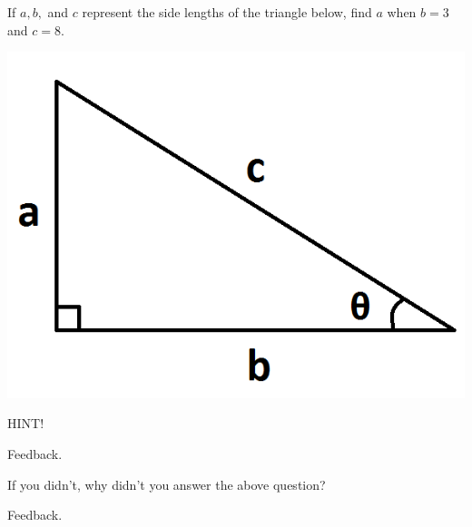\documentclass{ximera}
\begin{document}
\begin{problem} 

\begin{problem}
    
    If $a, b,$ and $c$ represent the side lengths of the triangle below, find $a$ when $b = 3$ and $c = 8$.
    
    \begin{center} \includegraphics[scale=0.3]{Triangle.png} \end{center}
    
    \begin{hint}
    HINT!
    \end{hint}

  \begin{multipleChoice}
      
      \begin{feedback}[attempt]
          Feedback.
      \end{feedback}
      
  \end{multipleChoice}
  
\end{problem}

\begin{question}
  
    If you didn't, why didn't you answer the above question?
  
  \begin{multipleChoice}
      
      \begin{feedback}[attempt]
      Feedback.
      \end{feedback}
  \end{multipleChoice}
  
\end{question}

\end{problem}
\end{document}
